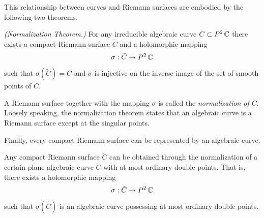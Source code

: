 This relationship between curves and Riemann surfaces are embodied by
the following two theorems.

\begin{theorem} \label{thm: normalization}
  {\it (Normalization Theorem.)} For any irreducible algebraic curve $C
  \subset P^2\operatorname{\mathbb{C}}$ there exists a compact Riemann surface $\tilde{C}$ and
  a holomorphic mapping
  \[
      \sigma : \tilde{C} \to P^2\operatorname{\mathbb{C}}
  \]
  such that $\sigma( \tilde{C} ) = C$ and $\sigma$ is injective on the
  inverse image of the set of smooth points of $C$.
\end{theorem}

A Riemann surface together with the mapping $\sigma$ is called the {\it
  normalization of $C$}. Loosely speaking, the normalization theorem
states that an algebraic curve is a Riemann surface except at the
singular points.

Finally, every compact Riemann surface can be represented by an
algebraic curve.

\begin{theorem} \label{thm: repr-theorem}
  Any compact Riemann surface $\tilde{C}$ can be obtained through the
  normalization of a certain plane algebraic curve $C$ with at most
  ordinary double points. That is, there exists a holomorphic mapping
  \[
      \sigma : \tilde{C} \to P^2\operatorname{\mathbb{C}}
  \]
  such that $\sigma(\tilde{C})$ is an algebraic curve possessing at most
  ordinary double points.
\end{theorem}
